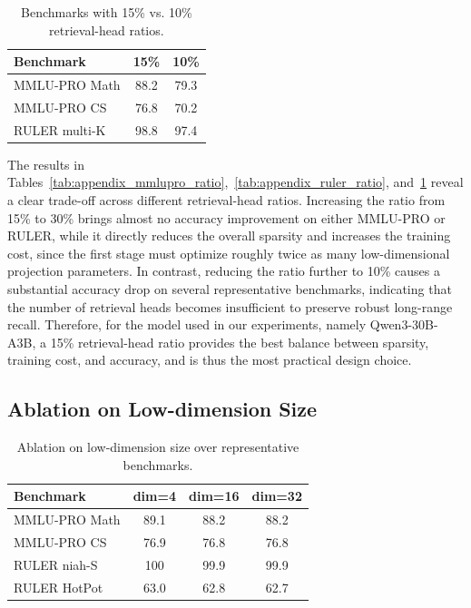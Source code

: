 \begin{table}[ht]
    \centering
    \normalsize
    \setlength{\tabcolsep}{6pt}
    \renewcommand{\arraystretch}{1.10}
    \caption{Benchmarks with 15\% vs. 10\% retrieval-head ratios.}
    \label{tab:appendix_ratio_small}
    \begin{tabular}{lcc}
        \toprule
        \textbf{Benchmark} & \textbf{15\%} & \textbf{10\%} \\
        \midrule
        MMLU-PRO Math & 88.2 & 79.3 \\
        MMLU-PRO CS & 76.8 & 70.2 \\
        RULER multi-K & 98.8 & 97.4 \\
        \bottomrule
    \end{tabular}
\end{table}

The results in Tables~\ref{tab:appendix_mmlupro_ratio},~\ref{tab:appendix_ruler_ratio}, and~\ref{tab:appendix_ratio_small} reveal a clear trade-off across different retrieval-head ratios. Increasing the ratio from 15\% to 30\% brings almost no accuracy improvement on either MMLU-PRO or RULER, while it directly reduces the overall sparsity and increases the training cost, since the first stage must optimize roughly twice as many low-dimensional projection parameters. In contrast, reducing the ratio further to 10\% causes a substantial accuracy drop on several representative benchmarks, indicating that the number of retrieval heads becomes insufficient to preserve robust long-range recall. Therefore, for the model used in our experiments, namely Qwen3-30B-A3B, a 15\% retrieval-head ratio provides the best balance between sparsity, training cost, and accuracy, and is thus the most practical design choice.

\subsection{Ablation on Low-dimension Size}
\label{appd:lowdim}


\begin{table}[ht]
    \centering
    \small
    \caption{Ablation on low-dimension size over representative benchmarks.}
    \label{tab:appendix_lowdim_accuracy}
    \begin{tabular}{lccc}
        \toprule
        \textbf{Benchmark} & \textbf{dim=4} & \textbf{dim=16} & \textbf{dim=32} \\
        \midrule
        MMLU-PRO Math & 89.1 & 88.2 & 88.2 \\
        MMLU-PRO CS & 76.9 & 76.8 & 76.8 \\
        RULER niah-S & 100 & 99.9 & 99.9 \\
        RULER HotPot & 63.0 & 62.8 & 62.7 \\
        \bottomrule
    \end{tabular}
\end{table}

